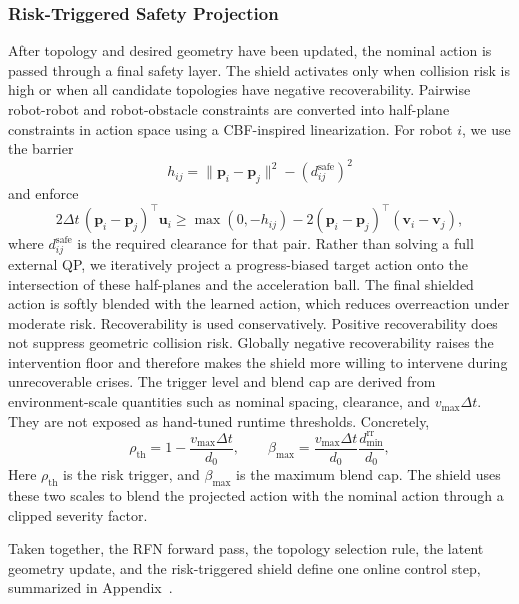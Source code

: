 \documentclass{ieeeaccess}
\newcommand{\bfu}{\mathbf{u}}
\newcommand{\bfp}{\mathbf{p}}
\newcommand{\bfv}{\mathbf{v}}
\begin{document}
\subsubsection{Risk-Triggered Safety Projection}
\label{sec:shield}

After topology and desired geometry have been updated, the nominal action is passed through a final safety layer. The shield activates only when collision risk is high or when all candidate topologies have negative recoverability. Pairwise robot-robot and robot-obstacle constraints are converted into half-plane constraints in action space using a CBF-inspired linearization. For robot $i$, we use the barrier
\begin{equation}
h_{ij} = \|\bfp_i - \bfp_j\|^2 - (d_{ij}^{\mathrm{safe}})^2
\label{eq:barrier}
\end{equation}
and enforce
\begin{equation}
2\Delta t\,(\bfp_i-\bfp_j)^\top \bfu_i \ge
\max(0,-h_{ij}) - 2(\bfp_i-\bfp_j)^\top(\bfv_i-\bfv_j),
\label{eq:cbf_constraint}
\end{equation}
where $d_{ij}^{\mathrm{safe}}$ is the required clearance for that pair.
Rather than solving a full external QP, we iteratively project a
progress-biased target action onto the intersection of these
half-planes and the acceleration ball. The final shielded action is
softly blended with the learned action, which reduces overreaction
under moderate risk. Recoverability is used conservatively. Positive
recoverability does not suppress geometric collision risk. Globally
negative recoverability raises the intervention floor and therefore
makes the shield more willing to intervene during unrecoverable crises.
The trigger level and blend cap are derived from environment-scale
quantities such as nominal spacing, clearance, and $v_{\max}\Delta t$.
They are not exposed as hand-tuned runtime thresholds. Concretely,
\begin{equation}
\rho_{\mathrm{th}} =
1 - \frac{v_{\max}\Delta t}{d_0},
\qquad
\beta_{\max} =
\frac{v_{\max}\Delta t}{d_0}
\frac{d_{\min}^{\mathrm{rr}}}{d_0},
\label{eq:shield_scales}
\end{equation}
Here $\rho_{\mathrm{th}}$ is the risk trigger, and $\beta_{\max}$ is
the maximum blend cap. The shield uses these two scales to blend the
projected action with the nominal action through a clipped severity
factor.

Taken together, the RFN forward pass, the topology selection rule, the latent geometry update, and the risk-triggered shield define one online control step, summarized in Appendix~.
\end{document}

